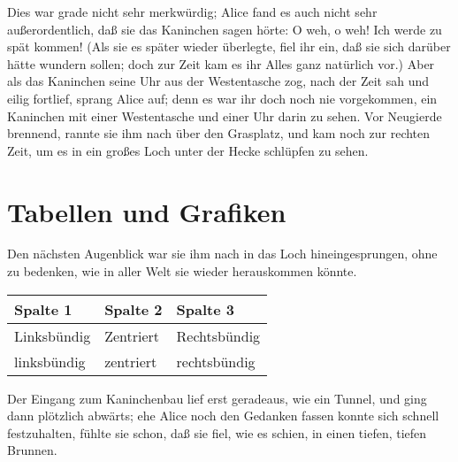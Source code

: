 \documentclass[DIV=calc,10pt,parskip=half,twocolumn]{scrartcl}
\begin{document}
Dies war grade nicht sehr merkwürdig; Alice fand es auch nicht sehr
außerordentlich, daß sie das Kaninchen sagen hörte: \grqq{} O weh, o weh! Ich werde zu
spät kommen!\grqq{}  (Als sie es später wieder überlegte, fiel ihr ein, daß sie sich
darüber hätte wundern sollen; doch zur Zeit kam es ihr Alles ganz natürlich
vor.) Aber als das Kaninchen seine Uhr aus der Westentasche zog, nach der Zeit
sah und eilig fortlief, sprang Alice auf; denn es war ihr doch noch nie
vorgekommen, ein Kaninchen mit einer Westentasche und einer Uhr darin zu sehen.
Vor Neugierde brennend, rannte sie ihm nach über den Grasplatz, und kam noch
zur rechten Zeit, um es in ein großes Loch unter der Hecke schlüpfen zu sehen.




\section{Tabellen und Grafiken}

Den nächsten Augenblick war sie ihm nach in das Loch hineingesprungen, ohne zu
bedenken, wie in aller Welt sie wieder herauskommen könnte.

\begin{center}
\begin{tabular}{lll}
  \toprule
   Spalte 1 &  Spalte 2 & Spalte 3\\
   \midrule
   Linksbündig & Zentriert & Rechtsbündig\\
   linksbündig & zentriert & rechtsbündig\\
   \bottomrule
\end{tabular}
\end{center}

Der Eingang zum Kaninchenbau lief erst geradeaus, wie ein Tunnel, und ging dann
plötzlich abwärts; ehe Alice noch den Gedanken fassen konnte sich schnell
festzuhalten, fühlte sie schon, daß sie fiel, wie es schien, in einen tiefen,
tiefen Brunnen.







\end{document}
